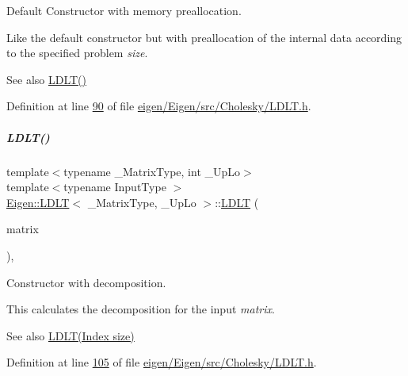 Default Constructor with memory preallocation. 

Like the default constructor but with preallocation of the internal data according to the specified problem {\itshape size}. \begin{DoxySeeAlso}{See also}
\hyperlink{group___cholesky___module_a2e06dedd2651649c5b251fbf9ba4e7d4}{L\+D\+L\+T()} 
\end{DoxySeeAlso}


Definition at line \hyperlink{eigen_2_eigen_2src_2_cholesky_2_l_d_l_t_8h_source_l00090}{90} of file \hyperlink{eigen_2_eigen_2src_2_cholesky_2_l_d_l_t_8h_source}{eigen/\+Eigen/src/\+Cholesky/\+L\+D\+L\+T.\+h}.

\mbox{\label{group___cholesky___module_ad0e8d2131ea1a626a08d98e9effb1cc5}} 
\subparagraph{\texorpdfstring{L\+D\+L\+T()}{LDLT()}\hspace{0.1cm}{\footnotesize\ttfamily [3/8]}}
{\footnotesize\ttfamily template$<$typename \+\_\+\+Matrix\+Type, int \+\_\+\+Up\+Lo$>$ \\
template$<$typename Input\+Type $>$ \\
\hyperlink{group___cholesky___module_class_eigen_1_1_l_d_l_t}{Eigen\+::\+L\+D\+LT}$<$ \+\_\+\+Matrix\+Type, \+\_\+\+Up\+Lo $>$\+::\hyperlink{group___cholesky___module_class_eigen_1_1_l_d_l_t}{L\+D\+LT} (\begin{DoxyParamCaption}\item[{const \hyperlink{group___core___module_struct_eigen_1_1_eigen_base}{Eigen\+Base}$<$ Input\+Type $>$ \&}]{matrix }\end{DoxyParamCaption})\hspace{0.3cm}{\ttfamily [inline]}, {\ttfamily [explicit]}}



Constructor with decomposition. 

This calculates the decomposition for the input {\itshape matrix}.

\begin{DoxySeeAlso}{See also}
\hyperlink{group___cholesky___module_a154aa41bd2460199d48861eaf5e4f597}{L\+D\+L\+T(\+Index size)} 
\end{DoxySeeAlso}


Definition at line \hyperlink{eigen_2_eigen_2src_2_cholesky_2_l_d_l_t_8h_source_l00105}{105} of file \hyperlink{eigen_2_eigen_2src_2_cholesky_2_l_d_l_t_8h_source}{eigen/\+Eigen/src/\+Cholesky/\+L\+D\+L\+T.\+h}.

